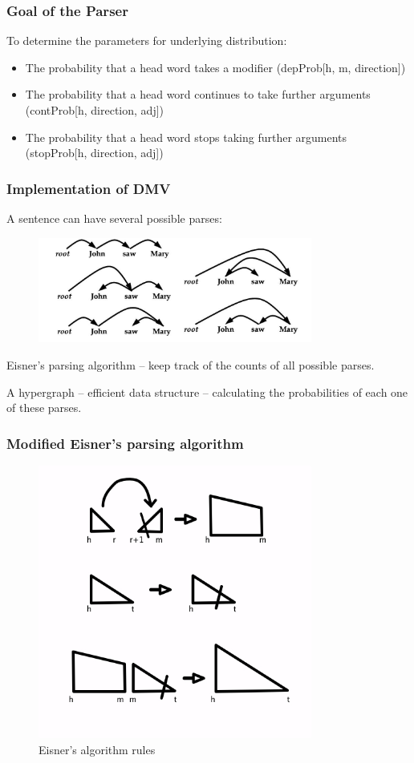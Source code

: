 \documentclass{beamer}
\begin{document}
\begin{frame}
  \frametitle{Goal of the Parser}
  To determine the parameters for underlying distribution:
\begin{itemize}
\item The probability that a head word takes a modifier (depProb[h, m, direction])
\item The probability that a head word continues to take further arguments (contProb[h, direction, adj])
\item The probability that a head word stops taking further arguments (stopProb[h, direction, adj])
\end{itemize}
\end{frame}


\begin{frame}
  \frametitle{Implementation of DMV}
A sentence can have several possible parses:

\begin{figure}[!ht]
\centering
\includegraphics[width=90mm]{images/rsz_all_deps.jpg}
\label{overflow}
\end{figure}


Eisner’s parsing algorithm -- keep track of the counts of all possible parses.

A hypergraph -- efficient data structure -- calculating the probabilities of each one of these parses.
\end{frame}

\begin{frame}
\frametitle{Modified Eisner's parsing algorithm}

\begin{figure}
\centering
\includegraphics[width=90mm]{images/eisner_rules.jpg}
\caption{Eisner's algorithm rules}
\label{overflow}
\end{figure}

\end{frame}
\end{document}
